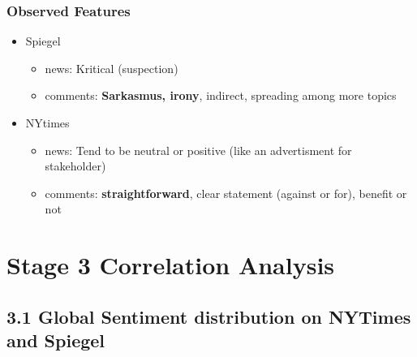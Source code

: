 \documentclass{tum-presentation}
\begin{document}
\begin{frame}
  \frametitle{Observed Features}
 
  \begin{itemize}
    \item Spiegel
    \begin{itemize}
      \item news: Kritical (suspection) 
      \item comments:  \textbf{Sarkasmus, irony}, indirect, spreading among more topics 
    \end{itemize}
    \item NYtimes
    \begin{itemize}
      \item news: Tend to be neutral or positive (like an advertisment for stakeholder)
    \item comments: \textbf{straightforward}, clear statement (against or for), benefit or not
      \end{itemize}
  \end{itemize}

\end{frame}
\section{Stage 3 Correlation Analysis}
\subsection{3.1 Global Sentiment distribution on NYTimes and Spiegel }
\begin{frame}[shrink]
  \tableofcontents[currentsection,hideallsubsections,sectionstyle=show/shaded,subsectionstyle=show/shaded/hide]
\end{frame}
\end{document}

